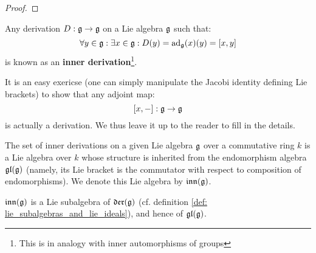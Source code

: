                \begin{proof}
                    
                \end{proof}
            \begin{definition} \label{def: lie_algebra_inner_derivations}
                Any derivation $D: \mathfrak{g} \to \mathfrak{g}$ on a Lie algebra $\mathfrak{g}$ such that:
                    $$\forall y \in \mathfrak{g}: \exists x \in \mathfrak{g}: D(y) = \mathrm{ad}_{\mathfrak{g}}(x)(y) = [x, y]$$
                is known as an \textbf{inner derivation}\footnote{This is in analogy with inner automorphisms of groups}.
            \end{definition}
            \begin{remark}
                It is an easy exericse (one can simply manipulate the Jacobi identity defining Lie brackets) to show that any adjoint map:
                    $$[x, -]: \mathfrak{g} \to \mathfrak{g}$$
                is actually a derivation. We thus leave it up to the reader to fill in the details. 
            \end{remark}
            \begin{convention}
                The set of inner derivations on a given Lie algebra $\mathfrak{g}$ over a commutative ring $k$ is a Lie algebra over $k$ whose structure is inherited from the endomorphism algebra $\mathfrak{gl}(\mathfrak{g})$ (namely, its Lie bracket is the commutator with respect to composition of endomorphisms). We denote this Lie algebra by $\mathfrak{inn}(\mathfrak{g})$.
            \end{convention}
            \begin{remark}
                $\mathfrak{inn}(\mathfrak{g})$ is a Lie subalgebra of $\mathfrak{der}(\mathfrak{g})$ (cf. definition \ref{def: lie_subalgebras_and_lie_ideals}), and hence of $\mathfrak{gl}(\mathfrak{g})$. 
            \end{remark}
                
